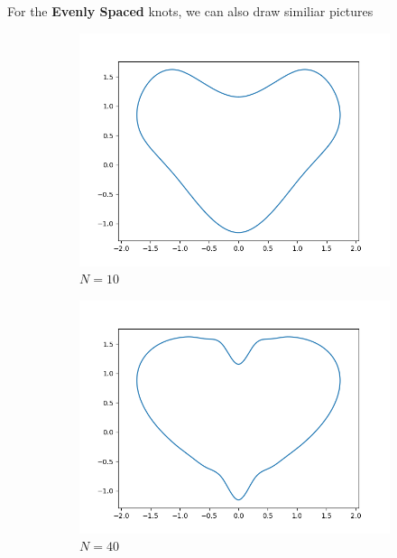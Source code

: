 \documentclass[a4paper]{article}
\begin{document}
For the \textbf{Evenly Spaced} knots, we can also draw similiar pictures
\begin{figure}[H]
    \centering
    \begin{subfigure}[b]{0.35\textwidth}
        \centering
        \includegraphics[width=\textwidth]{../figure/E_heart_PP10.png}
        \caption{$N = 10$}
    \end{subfigure}
    \begin{subfigure}[b]{0.35\textwidth}
        \centering
        \includegraphics[width=\textwidth]{../figure/E_heart_PP40.png}
        \caption{$N = 40$}
    \end{subfigure}
    \\ 
    \begin{subfigure}[b]{0.35\textwidth}

\end{subfigure}
\end{figure}
\end{document}
